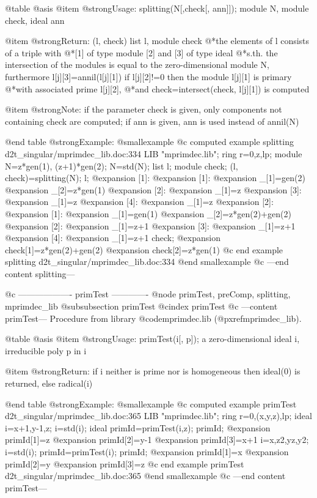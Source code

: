 @table @asis
@item @strong{Usage:}
splitting(N[,check[, ann]]); module N, module check, ideal ann

@item @strong{Return:}
(l, check) list l, module check
@*the elements of l consists of a triple with
@*[1] of type module [2] and [3] of type ideal
@*s.th. the intersection of the modules is equal to the
zero-dimensional module N, furthermore l[j][3]=annil(l[j][1])
if l[j][2]!=0 then the module l[j][1] is primary
@*with associated prime l[j][2],
@*and check=intersect(check, l[j][1]) is computed

@item @strong{Note:}
if the parameter check is given, only components not containing
check are computed; if ann is given, ann is used instead of annil(N)

@end table
@strong{Example:}
@smallexample
@c computed example splitting d2t_singular/mprimdec_lib.doc:334 
LIB "mprimdec.lib";
ring r=0,z,lp;
module N=z*gen(1), (z+1)*gen(2);
N=std(N);
list l; module check;
(l, check)=splitting(N);
l;
@expansion{} [1]:
@expansion{}    [1]:
@expansion{}       _[1]=gen(2)
@expansion{}       _[2]=z*gen(1)
@expansion{}    [2]:
@expansion{}       _[1]=z
@expansion{}    [3]:
@expansion{}       _[1]=z
@expansion{}    [4]:
@expansion{}       _[1]=z
@expansion{} [2]:
@expansion{}    [1]:
@expansion{}       _[1]=gen(1)
@expansion{}       _[2]=z*gen(2)+gen(2)
@expansion{}    [2]:
@expansion{}       _[1]=z+1
@expansion{}    [3]:
@expansion{}       _[1]=z+1
@expansion{}    [4]:
@expansion{}       _[1]=z+1
check;
@expansion{} check[1]=z*gen(2)+gen(2)
@expansion{} check[2]=z*gen(1)
@c end example splitting d2t_singular/mprimdec_lib.doc:334
@end smallexample
@c ---end content splitting---

@c ------------------- primTest -------------
@node primTest, preComp, splitting, mprimdec_lib
@subsubsection primTest
@cindex primTest
@c ---content primTest---
Procedure from library @code{mprimdec.lib} (@pxref{mprimdec_lib}).

@table @asis
@item @strong{Usage:}
primTest(i[, p]); a zero-dimensional ideal i, irreducible poly p in i

@item @strong{Return:}
if i neither is prime nor is homogeneous then ideal(0) is returned,
else radical(i)

@end table
@strong{Example:}
@smallexample
@c computed example primTest d2t_singular/mprimdec_lib.doc:365 
LIB "mprimdec.lib";
ring r=0,(x,y,z),lp;
ideal i=x+1,y-1,z;
i=std(i);
ideal primId=primTest(i,z);
primId;
@expansion{} primId[1]=z
@expansion{} primId[2]=y-1
@expansion{} primId[3]=x+1
i=x,z2,yz,y2;
i=std(i);
primId=primTest(i);
primId;
@expansion{} primId[1]=x
@expansion{} primId[2]=y
@expansion{} primId[3]=z
@c end example primTest d2t_singular/mprimdec_lib.doc:365
@end smallexample
@c ---end content primTest---

